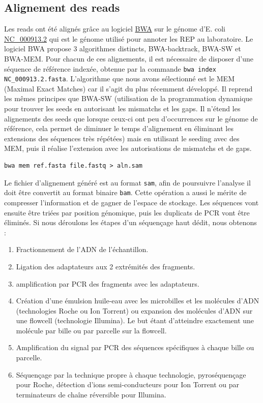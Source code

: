\documentclass[12pt,a4paper]{report}
\begin{document}
\begin{onehalfspace}
\section*{Alignement des reads}
Les reads ont été alignés grâce au logiciel \href{http://bio-bwa.sourceforge.net/}{BWA} sur le génome d'E. coli \href{http://www.ncbi.nlm.nih.gov/nuccore/NC_000913.2}{NC\_000913.2} qui est le génome utilisé pour annoter les REP au laboratoire.  Le logiciel BWA propose 3 algorithmes distincts, BWA-backtrack, BWA-SW et BWA-MEM. Pour chacun de ces alignements, il est nécessaire de disposer d'une séquence de référence indexée, obtenue par la commande \texttt{bwa index NC\_000913.2.fasta}. 
L'algorithme que nous avons sélectionné est le MEM (Maximal Exact Matches) car il s'agit du plus récemment développé. Il reprend les mêmes principes que BWA-SW (utilisation de la programmation dynamique pour trouver les seeds en autorisant les mismatchs et les gaps. Il n'étend les alignements des seeds que lorsque ceux-ci ont peu d'occurrences sur le génome de référence, cela permet de diminuer le temps d'alignement en éliminant les extensions des séquences très répétées) mais en utilisant le seeding avec des MEM, puis il réalise l'extension avec les autorisations de mismatchs et de gaps.
\lstset{language=sh}  
\begin{lstlisting}[frame=single]
bwa mem ref.fasta file.fastq > aln.sam
\end{lstlisting}
Le fichier d'alignement généré est au format \texttt{\gls{sam}}, afin de poursuivre l'analyse il doit être convertit au format binaire \texttt{\gls{bam}}. Cette opération a aussi le mérite de compresser l'information et de gagner de l'espace de stockage. Les séquences vont ensuite être triées par position génomique, puis les duplicats de PCR vont être éliminés.
Si nous déroulons les étapes d'un séquençage haut dédit, nous obtenons :
\begin{enumerate}
\item Fractionnement de l'ADN de l'échantillon.
\item Ligation des adaptateurs aux 2 extrémités des fragments.
\item amplification par PCR des fragments avec les adaptateurs.
\item Création d'une émulsion huile-eau avec les microbilles et les molécules d'ADN (technologies
Roche ou Ion Torrent) ou expansion des molécules d'ADN sur une flowcell (technologie
Illumina). Le but étant d'atteindre exactement une molécule par bille ou par parcelle sur la
flowcell.
\item Amplification du signal par PCR des séquences spécifiques à chaque bille ou parcelle.
\item Séquençage par la technique propre à chaque technologie, pyroséquençage pour Roche,
détection d'ions semi-conducteurs pour Ion Torrent ou par terminateurs de chaîne réversible
pour Illumina.
\end{enumerate}


\end{onehalfspace}
\end{document}
